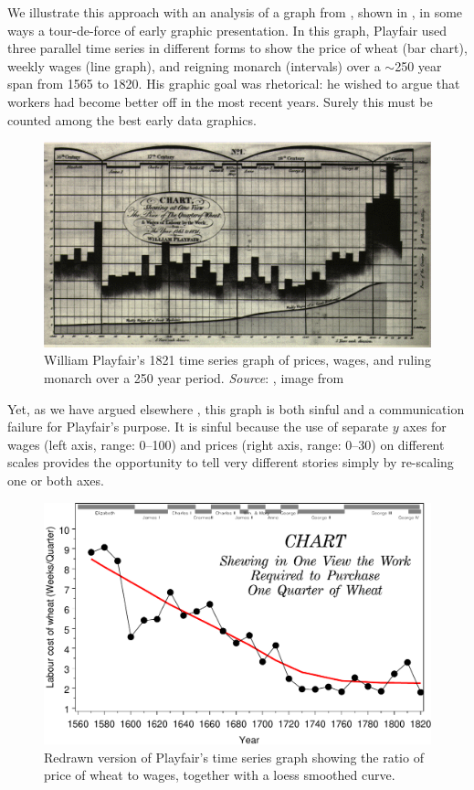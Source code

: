 We illustrate this approach with an analysis of a graph from \citep{Playfair:1821},
shown in , in some ways a tour-de-force of
early graphic presentation. In this graph, Playfair used three parallel time
series in different forms
to show the price of wheat (bar chart), weekly wages (line graph), and reigning monarch (intervals)
over a $\sim$250 year span from 1565 to 1820. His graphic goal was rhetorical: he wished to
argue that workers had become better off in the most recent years. Surely this must be counted
among the best early data graphics.

\begin{figure}[htb]
  \centering
  \includegraphics[width=\textwidth]{fig/playfair-wheat1}
  \caption{William Playfair's 1821 time series graph of prices, wages, and ruling monarch
  over a 250 year period.
  \emph{Source}: \cite{Playfair:1821}, image from \citet[p. 34]{Tufte:1983}}%
  \label{fig:playfair-wheat1}
\end{figure}

Yet, as we have argued elsewhere \citep{FriendlyDenis:05:scat}, this graph is both sinful
and a communication failure for Playfair's purpose.  It is sinful because the use of separate $y$ axes for
wages (left axis, range: 0--100) and prices (right axis, range: 0--30) on different scales
provides the opportunity to tell very different stories simply by re-scaling one or both
axes.

\begin{figure}[!htb]
  \centering
  \includegraphics[width=.9\textwidth,clip]{fig/wheat1}
  \caption{Redrawn version of Playfair's time series graph
  showing the ratio of price of wheat to wages,
  together with a loess smoothed curve.}
  \label{fig:wheat1}
\end{figure}

